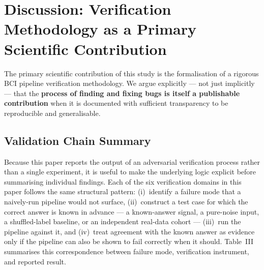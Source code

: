 \documentclass[11pt]{article}
\begin{document}
\section{Discussion: Verification Methodology as a Primary Scientific Contribution}

The primary scientific contribution of this study is the formalisation of a rigorous BCI pipeline verification methodology. We argue explicitly --- not just implicitly --- that the \textbf{process of finding and fixing bugs is itself a publishable contribution} when it is documented with sufficient transparency to be reproducible and generalisable.

\subsection{Validation Chain Summary}

Because this paper reports the output of an adversarial verification process rather than a single experiment, it is useful to make the underlying logic explicit before summarising individual findings. Each of the six verification domains in this paper follows the same structural pattern: (i)~identify a failure mode that a naively-run pipeline would not surface, (ii)~construct a test case for which the correct answer is known in advance --- a known-answer signal, a pure-noise input, a shuffled-label baseline, or an independent real-data cohort --- (iii)~run the pipeline against it, and (iv)~treat agreement with the known answer as evidence only if the pipeline can also be shown to fail correctly when it should. Table~III summarises this correspondence between failure mode, verification instrument, and reported result.
\end{document}
